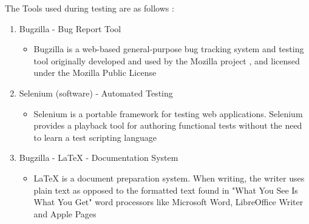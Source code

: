 The Tools used during testing are as follows :

\begin{enumerate}
   \item Bugzilla - Bug Report Tool
   \begin{itemize}
     \item Bugzilla is a web-based general-purpose bug tracking system and testing tool originally developed and used by the Mozilla project
     , and licensed under the Mozilla Public License
   \end{itemize}
   \item Selenium (software) - Automated Testing
   \begin{itemize}
     \item Selenium is a portable framework for testing web applications. Selenium provides a playback tool for authoring
      functional tests without the need to learn a test scripting language
   \end{itemize}

   \item Bugzilla - LaTeX - Documentation System
   \begin{itemize}
     \item LaTeX is a document preparation system. When writing, the writer uses plain text as opposed to the formatted text found in "What You See Is What You Get"
      word processors like Microsoft Word, LibreOffice Writer and Apple Pages
   \end{itemize}
\end{enumerate}
